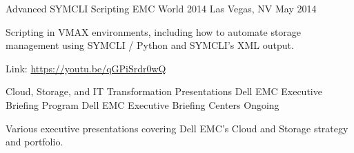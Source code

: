 


\begin{cventries}


\cventry
{Advanced SYMCLI Scripting} %
{EMC World 2014} %
{Las Vegas, NV} %
{May 2014} %
{ %
\begin{cvitems}
\item {Scripting in VMAX environments, including how to automate storage management using SYMCLI / Python and SYMCLI's XML output. }
\item {Link: \href{https://youtu.be/qGPiSrdr0wQ}{https://youtu.be/qGPiSrdr0wQ}}
\end{cvitems}
}


\cventry
{Cloud, Storage, and IT Transformation Presentations} %
{Dell EMC Executive Briefing Program} %
{Dell EMC Executive Briefing Centers} %
{Ongoing} %
{ %
\begin{cvitems}
\item {Various executive presentations covering Dell EMC's Cloud and Storage strategy and portfolio.}
\end{cvitems}
}

\end{cventries}